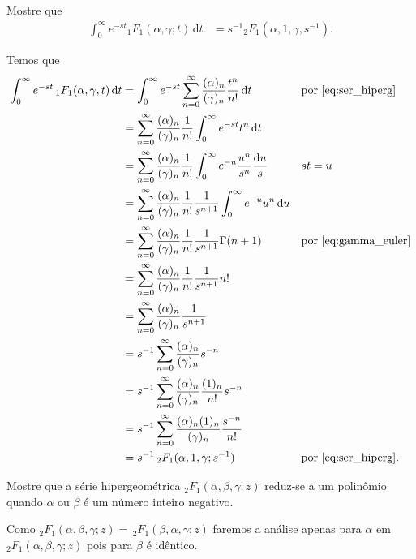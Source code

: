 \documentclass[a4paper,12pt, leqno, answers]{exam}
\begin{document}
\begin{questions}
    \question[Exame de 2006] Mostre que
    \begin{align*}
        \int_0^\infty e^{-s t} {}_1F_1(\alpha, \gamma; t) \,\mathrm{d}t &= s^{-1} {}_2F_1(\alpha, 1, \gamma, s^{-1}).
    \end{align*}
    \begin{solution}
        Temos que
        \begin{align*}
            \int_0^\infty e^{-st} \,_1F_1(\alpha, \gamma, t) \,\mathrm{d}t &= \int_0^\infty e^{-st} \sum_{n = 0}^\infty \frac{(\alpha)_n}{(\gamma)_n} \frac{t^n}{n!} \,\mathrm{d}t && \text{por \eqref{eq:ser_hiperg}} \\
            &= \sum_{n = 0}^\infty \frac{(\alpha)_n}{(\gamma)_n} \frac{1}{n!} \int_0^\infty e^{-st} t^n \,\mathrm{d}t \\
            &= \sum_{n = 0}^\infty \frac{(\alpha)_n}{(\gamma)_n} \frac{1}{n!} \int_0^\infty e^{-u} \frac{u^n}{s^n} \frac{\mathrm{d}u}{s} && st = u \\
            &= \sum_{n = 0}^\infty \frac{(\alpha)_n}{(\gamma)_n} \frac{1}{n!} \frac{1}{s^{n + 1}} \int_0^\infty e^{-u} u^n \,\mathrm{d}u \\
            &= \sum_{n = 0}^\infty \frac{(\alpha)_n}{(\gamma)_n} \frac{1}{n!} \frac{1}{s^{n + 1}} \Gamma(n + 1) && \text{por \eqref{eq:gamma_euler}} \\
            &= \sum_{n = 0}^\infty \frac{(\alpha)_n}{(\gamma)_n} \frac{1}{n!} \frac{1}{s^{n + 1}} n! \\
            &= \sum_{n = 0}^\infty \frac{(\alpha)_n}{(\gamma)_n} \frac{1}{s^{n + 1}} \\
            &= s^{-1} \sum_{n = 0}^\infty \frac{(\alpha)_n}{(\gamma)_n} s^{-n} \\
            &= s^{-1} \sum_{n = 0}^\infty \frac{(\alpha)_n}{(\gamma)_n} \frac{(1)_n}{n!} s^{-n} \\
            &= s^{-1} \sum_{n = 0}^\infty \frac{(\alpha)_n (1)_n}{(\gamma)_n} \frac{s^{-n}}{n!} \\
            &= s^{-1} \,_2F_1(\alpha, 1, \gamma; s^{-1}) && \text{por \eqref{eq:ser_hiperg}}.
        \end{align*}
    \end{solution}

    \question Mostre que a s\'{e}rie hipergeom\'{e}trica ${}_2F_1(\alpha, \beta, \gamma; z)$ reduz-se a um polin\^{o}mio quando $\alpha$ ou $\beta$ \'{e} um número inteiro negativo.
    \begin{solution}
        Como $_2F_1(\alpha, \beta, \gamma; z) = \,_2F_1(\beta, \alpha, \gamma; z)$ faremos a an\'{a}lise apenas para $\alpha$ em $_2F_1(\alpha, \beta, \gamma; z)$ pois para $\beta$ \'{e} id\^{e}ntico.


\end{solution}
\end{questions}
\end{document}
